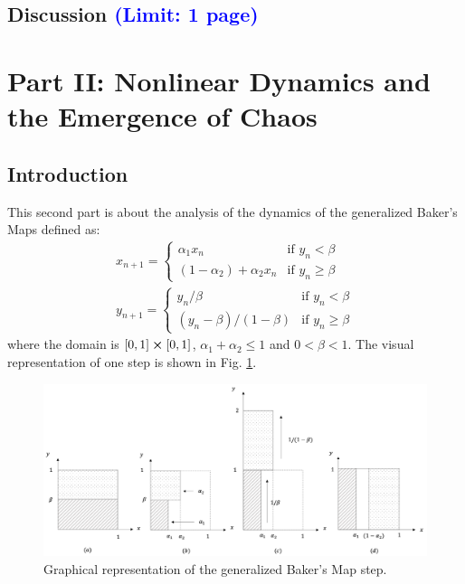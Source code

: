 \documentclass[11pt,titlepage]{article}
\begin{document}
\subsection{Discussion \textcolor{blue}{(Limit: 1 page)}} %

\newpage
\section{Part II: Nonlinear Dynamics and the Emergence of Chaos}


\subsection{Introduction} %
This second part is about the analysis of the dynamics of the generalized Baker's Maps defined as:
\begin{equation} \label{eq_map}
	\begin{gathered}
		x_{n+1} = 
		\begin{cases}
			\alpha_1 x_n & \text{if } y_n < \beta \\
			(1-\alpha_2) + \alpha_2 x_n & \text{if } y_n \ge \beta
		\end{cases}
	\\
	y_{n+1} = 
	\begin{cases}
		y_n/\beta & \text{if } y_n < \beta \\
		(y_n -\beta)/(1-\beta) & \text{if } y_n \ge \beta
	\end{cases}
	\end{gathered}
\end{equation}
where the domain is $[0,1] \cross [0,1]$, $\alpha_1 + \alpha_2\le 1$ and $0<\beta<1$. The visual representation of one step is shown in Fig.  \ref{fig14}.
\begin{center}
	\begin{figure} [h]
		\centering
		\includegraphics[width = 6in]{./figures/baker_map.png}
		\caption{Graphical representation of the generalized Baker's Map step.}
		\label{fig14}
	\end{figure}
\end{center}
\end{document}
